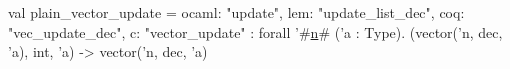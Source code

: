 val plain_vector_update = {
  ocaml: "update",
  lem: "update_list_dec",
  coq: "vec_update_dec",
  c: "vector_update"
} : forall '#\hyperref[zn]{n}# ('a : Type). (vector('n, dec, 'a), int, 'a) -> vector('n, dec, 'a)
